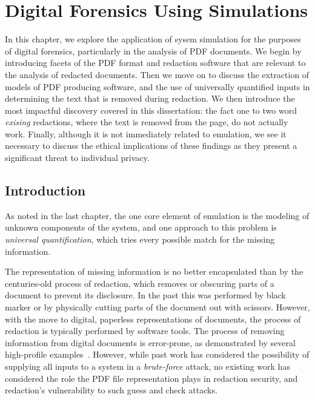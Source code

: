 \chapter{Digital Forensics Using Simulations}
\label{chap:info}


In this chapter, we explore the application of sysem simulation for the purposes of digital forensics, particularly in the analysis of PDF documents.
We begin by introducing facets of the PDF format and redaction software that are relevant to the analysis of redacted documents.
Then we move on to discuss the extraction of models of PDF producing software, and the use of universally quantified inputs in determining the text that is removed during redaction.
We then introduce the most impactful discovery covered in this dissertation: the fact one to two word \emph{exising} redactions, where the text is removed from the page, do not actually work.
Finally, although it is not immediately related to emulation, we see it necessary to discuss the ethical implications of these findings as they present a significant threat to individual privacy.

\section{Introduction}

As noted in the last chapter, the one core element of emulation is the modeling of unknown components of the system, and one approach to this problem is \emph{universal quantification}, which tries every possible match for the missing information.

The representation of missing information is no better encapsulated than by the centuries-old process of redaction, which removes or obscuring parts of a document to prevent its disclosure. 
In the past this was performed by black marker or by physically cutting parts of the document out with scissors.
However, with the move to digital, paperless representations of documents, the process of redaction is typically performed by software tools.
The process of removing information from digital documents is error-prone, as demonstrated by several high-profile examples~\cite{embarassingRedact}.
However, while past work has considered the possibility of supplying all inputs to a system in a \emph{brute-force} attack, no existing work has considered the role the PDF file representation plays in redaction security, and redaction's vulnerability to such guess and check attacks.

